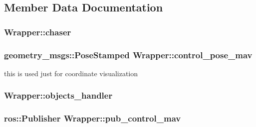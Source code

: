 \subsection{Member Data Documentation}
\subsubsection[{\texorpdfstring{chaser}{chaser}}]{ Wrapper\+::chaser}\hypertarget{class_wrapper_a750309ad3470e20a80e9d72b0d7e34cb}{}\label{class_wrapper_a750309ad3470e20a80e9d72b0d7e34cb}
\subsubsection[{\texorpdfstring{control\+\_\+pose\+\_\+mav}{control_pose_mav}}]{\setlength{\rightskip}{0pt plus 5cm}geometry\+\_\+msgs\+::\+Pose\+Stamped Wrapper\+::control\+\_\+pose\+\_\+mav\hspace{0.3cm}{\ttfamily [private]}}\hypertarget{class_wrapper_af4924938512380aebb652bbfbb914100}{}\label{class_wrapper_af4924938512380aebb652bbfbb914100}


this is used just for coordinate visualization 

\subsubsection[{\texorpdfstring{objects\+\_\+handler}{objects_handler}}]{ Wrapper\+::objects\+\_\+handler}\hypertarget{class_wrapper_a8cddd5ffbaeb5ab0b5d8d8d0c74f810f}{}\label{class_wrapper_a8cddd5ffbaeb5ab0b5d8d8d0c74f810f}
\subsubsection[{\texorpdfstring{pub\+\_\+control\+\_\+mav}{pub_control_mav}}]{\setlength{\rightskip}{0pt plus 5cm}ros\+::\+Publisher Wrapper\+::pub\+\_\+control\+\_\+mav\hspace{0.3cm}{\ttfamily [private]}}\hypertarget{class_wrapper_a53e4eb7536dcbb34f816dbd464fceb5c}{}\label{class_wrapper_a53e4eb7536dcbb34f816dbd464fceb5c}


